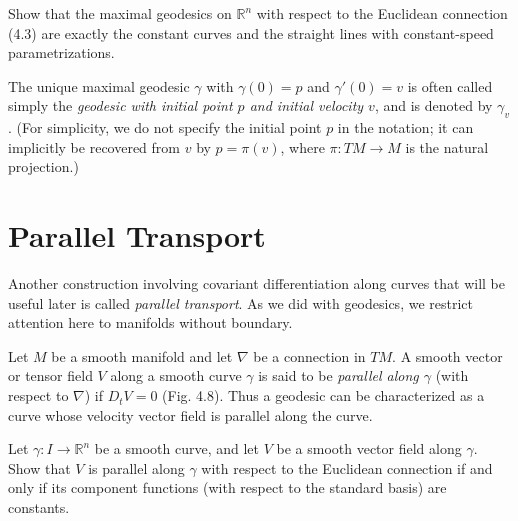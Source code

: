 \begin{exercise}
\label{exer:euclidean-geodesics}
Show that the maximal geodesics on $\mathbb{R}^n$ with respect to the Euclidean connection (4.3) are exactly the constant curves and the straight lines with constant-speed parametrizations.
\end{exercise}

The unique maximal geodesic $\gamma$ with $\gamma(0) = p$ and $\gamma'(0) = v$ is often called simply the \emph{geodesic with initial point $p$ and initial velocity $v$}, and is denoted by $\gamma_v$. (For simplicity, we do not specify the initial point $p$ in the notation; it can implicitly be recovered from $v$ by $p = \pi(v)$, where $\pi : TM \to M$ is the natural projection.)

\section{Parallel Transport}

Another construction involving covariant differentiation along curves that will be useful later is called \emph{parallel transport}. As we did with geodesics, we restrict attention here to manifolds without boundary.

Let $M$ be a smooth manifold and let $\nabla$ be a connection in $TM$. A smooth vector or tensor field $V$ along a smooth curve $\gamma$ is said to be \emph{parallel along $\gamma$} (with respect to $\nabla$) if $D_t V = 0$ (Fig. 4.8). Thus a geodesic can be characterized as a curve whose velocity vector field is parallel along the curve.

\begin{exercise}\label{exer:parallel-vector-field-euclidean-connection}
Let $\gamma : I \to \mathbb{R}^n$ be a smooth curve, and let $V$ be a smooth vector field along $\gamma$. Show that $V$ is parallel along $\gamma$ with respect to the Euclidean connection if and only if its component functions (with respect to the standard basis) are constants.
\end{exercise}

